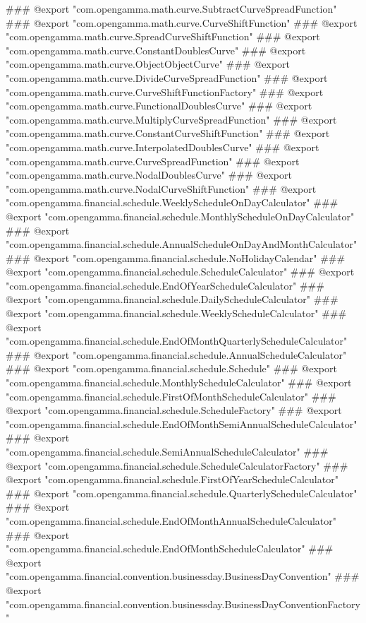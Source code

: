 ### @export "com.opengamma.math.curve.SubtractCurveSpreadFunction"
### @export "com.opengamma.math.curve.CurveShiftFunction"
### @export "com.opengamma.math.curve.SpreadCurveShiftFunction"
### @export "com.opengamma.math.curve.ConstantDoublesCurve"
### @export "com.opengamma.math.curve.ObjectObjectCurve"
### @export "com.opengamma.math.curve.DivideCurveSpreadFunction"
### @export "com.opengamma.math.curve.CurveShiftFunctionFactory"
### @export "com.opengamma.math.curve.FunctionalDoublesCurve"
### @export "com.opengamma.math.curve.MultiplyCurveSpreadFunction"
### @export "com.opengamma.math.curve.ConstantCurveShiftFunction"
### @export "com.opengamma.math.curve.InterpolatedDoublesCurve"
### @export "com.opengamma.math.curve.CurveSpreadFunction"
### @export "com.opengamma.math.curve.NodalDoublesCurve"
### @export "com.opengamma.math.curve.NodalCurveShiftFunction"
### @export "com.opengamma.financial.schedule.WeeklyScheduleOnDayCalculator"
### @export "com.opengamma.financial.schedule.MonthlyScheduleOnDayCalculator"
### @export "com.opengamma.financial.schedule.AnnualScheduleOnDayAndMonthCalculator"
### @export "com.opengamma.financial.schedule.NoHolidayCalendar"
### @export "com.opengamma.financial.schedule.ScheduleCalculator"
### @export "com.opengamma.financial.schedule.EndOfYearScheduleCalculator"
### @export "com.opengamma.financial.schedule.DailyScheduleCalculator"
### @export "com.opengamma.financial.schedule.WeeklyScheduleCalculator"
### @export "com.opengamma.financial.schedule.EndOfMonthQuarterlyScheduleCalculator"
### @export "com.opengamma.financial.schedule.AnnualScheduleCalculator"
### @export "com.opengamma.financial.schedule.Schedule"
### @export "com.opengamma.financial.schedule.MonthlyScheduleCalculator"
### @export "com.opengamma.financial.schedule.FirstOfMonthScheduleCalculator"
### @export "com.opengamma.financial.schedule.ScheduleFactory"
### @export "com.opengamma.financial.schedule.EndOfMonthSemiAnnualScheduleCalculator"
### @export "com.opengamma.financial.schedule.SemiAnnualScheduleCalculator"
### @export "com.opengamma.financial.schedule.ScheduleCalculatorFactory"
### @export "com.opengamma.financial.schedule.FirstOfYearScheduleCalculator"
### @export "com.opengamma.financial.schedule.QuarterlyScheduleCalculator"
### @export "com.opengamma.financial.schedule.EndOfMonthAnnualScheduleCalculator"
### @export "com.opengamma.financial.schedule.EndOfMonthScheduleCalculator"
### @export "com.opengamma.financial.convention.businessday.BusinessDayConvention"
### @export "com.opengamma.financial.convention.businessday.BusinessDayConventionFactory"
